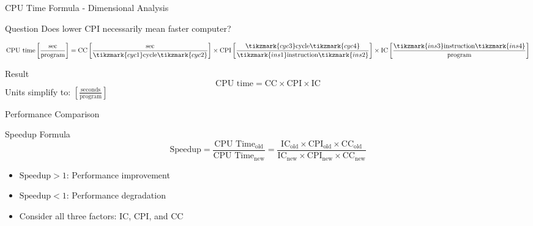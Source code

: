 \documentclass[aspectratio=169,12pt]{beamer}
\begin{document}
\begin{frame}{CPU Time Formula - Dimensional Analysis}
\centering
\begin{alertblock}{Question}
Does lower CPI necessarily mean faster computer?
\end{alertblock}
$$\text{CPU time}\left[\frac{\text{sec}}{\text{program}}\right] = 
\text{CC}\left[\frac{\text{sec}}{\tikzmark{cyc1}\text{cycle}\tikzmark{cyc2}}\right] \times
\text{CPI}\left[\frac{\tikzmark{cyc3}\text{cycle}\tikzmark{cyc4}}{\tikzmark{ins1}\text{instruction}\tikzmark{ins2}}\right] \times
\text{IC}\left[\frac{\tikzmark{ins3}\text{instruction}\tikzmark{ins4}}{\text{program}}\right]$$


\vspace{1cm}
\normalsize
\begin{block}{Result}
$$\text{CPU time} = \text{CC} \times \text{CPI} \times \text{IC}$$
Units simplify to: $\left[\frac{\text{seconds}}{\text{program}}\right]$
\end{block}
\end{frame}

\begin{frame}{Performance Comparison}
\begin{block}{Speedup Formula}
$$\text{Speedup} = \frac{\text{CPU Time}_\text{old}}{\text{CPU Time}_\text{new}}= \frac{\text{IC}_\text{old} \times \text{CPI}_\text{old} \times \text{CC}_\text{old}}{\text{IC}_\text{new} \times \text{CPI}_\text{new} \times \text{CC}_\text{new}}$$
\end{block}

\begin{itemize}
    \item $\text{Speedup} > 1$: Performance improvement
    \item $\text{Speedup} < 1$: Performance degradation
    \item Consider all three factors: IC, CPI, and CC
\end{itemize}
\end{frame}
\end{document}
